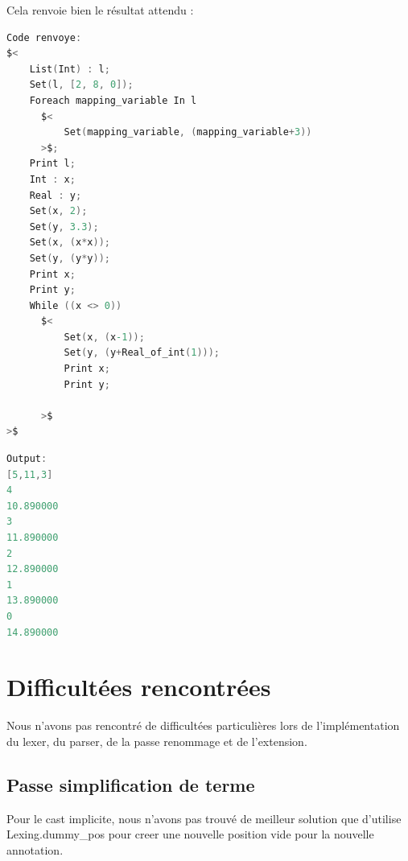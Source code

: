 \documentclass{report}
\begin{document}
    Cela renvoie bien le résultat attendu : \\

    \begin{lstlisting}[language=C, basicstyle=\ttfamily]
Code renvoye:
$<
    List(Int) : l;
    Set(l, [2, 8, 0]);
    Foreach mapping_variable In l
      $<
          Set(mapping_variable, (mapping_variable+3))
      >$;
    Print l;
    Int : x;
    Real : y;
    Set(x, 2);
    Set(y, 3.3);
    Set(x, (x*x));
    Set(y, (y*y));
    Print x;
    Print y;
    While ((x <> 0))
      $<
          Set(x, (x-1));
          Set(y, (y+Real_of_int(1)));
          Print x;
          Print y;
          
      >$
>$
    \end{lstlisting}

    \begin{lstlisting}[language=C, basicstyle=\ttfamily]
Output:
[5,11,3]
4
10.890000
3
11.890000
2
12.890000
1
13.890000
0
14.890000      
    \end{lstlisting}

    \newpage

\chapter{Difficultées rencontrées}

   \quad Nous n'avons pas rencontré de difficultées particulières lors de l'implémentation du lexer, du parser, de la passe renommage et de l'extension.\\

    \section{Passe simplification de terme}

    Pour le cast implicite, nous n'avons pas trouvé de meilleur solution que d'utilise Lexing.dummy\_pos pour creer une nouvelle position vide pour la nouvelle annotation.\\
\end{document}
